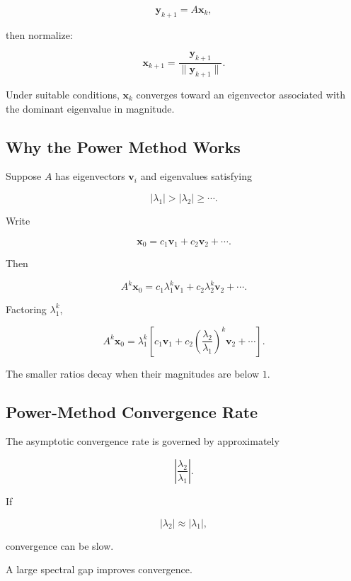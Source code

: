 \[
\boxed{
\mathbf{y}_{k+1}
=
A\mathbf{x}_k,
}
\]

then normalize:

\[
\boxed{
\mathbf{x}_{k+1}
=
\frac{
\mathbf{y}_{k+1}
}{
\|\mathbf{y}_{k+1}\|
}.
}
\]

Under suitable conditions, \(\mathbf{x}_k\) converges toward an eigenvector
associated with the dominant eigenvalue in magnitude.

\subsection{Why the Power Method Works}
\label{subsec:why-power-method-works}

Suppose \(A\) has eigenvectors \(\mathbf{v}_i\) and eigenvalues satisfying

\[
|\lambda_1|
>
|\lambda_2|
\geq
\cdots.
\]

Write

\[
\mathbf{x}_0
=
c_1\mathbf{v}_1
+
c_2\mathbf{v}_2
+
\cdots.
\]

Then

\[
A^k\mathbf{x}_0
=
c_1\lambda_1^k\mathbf{v}_1
+
c_2\lambda_2^k\mathbf{v}_2
+
\cdots.
\]

Factoring \(\lambda_1^k\),

\[
A^k\mathbf{x}_0
=
\lambda_1^k
\left[
c_1\mathbf{v}_1
+
c_2
\left(
\frac{\lambda_2}{\lambda_1}
\right)^k
\mathbf{v}_2
+
\cdots
\right].
\]

The smaller ratios decay when their magnitudes are below \(1\).

\subsection{Power-Method Convergence Rate}
\label{subsec:power-method-convergence}

The asymptotic convergence rate is governed by approximately

\[
\boxed{
\left|
\frac{
\lambda_2
}{
\lambda_1
}
\right|.
}
\]

If

\[
|\lambda_2|
\approx
|\lambda_1|,
\]

convergence can be slow.

A large spectral gap improves convergence.

